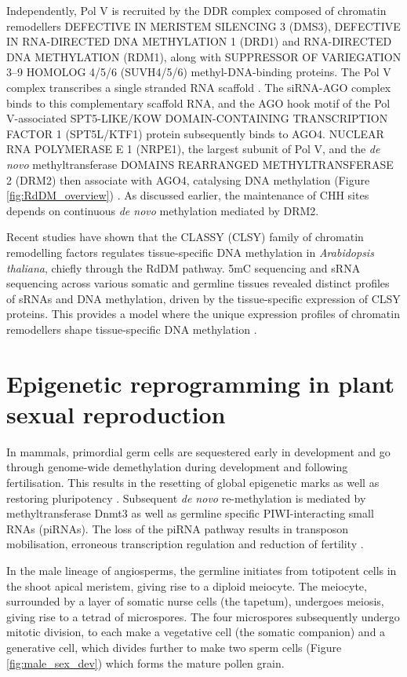 Independently, Pol V is recruited by the DDR complex composed of chromatin remodellers DEFECTIVE IN MERISTEM SILENCING 3 (DMS3), DEFECTIVE IN RNA-DIRECTED DNA METHYLATION 1 (DRD1) and RNA-DIRECTED DNA METHYLATION (RDM1), along with SUPPRESSOR OF VARIEGATION 3–9 HOMOLOG 4/5/6 (SUVH4/5/6) methyl-DNA-binding proteins. The Pol V complex transcribes a single stranded RNA scaffold \cite{RN33}. The siRNA-AGO complex binds to this complementary scaffold RNA, and the AGO hook motif of the Pol V-associated SPT5-LIKE/KOW DOMAIN-CONTAINING TRANSCRIPTION FACTOR 1 (SPT5L/KTF1) protein subsequently binds to AGO4. NUCLEAR RNA POLYMERASE E 1 (NRPE1), the largest subunit of Pol V, and the \textit{de novo} methyltransferase DOMAINS REARRANGED METHYLTRANSFERASE 2 (DRM2) then associate with AGO4, catalysing DNA methylation (Figure \ref{fig:RdDM_overview})  \cite{RN228,RN121,RN122}. As discussed earlier, the maintenance of CHH sites depends on continuous \textit{de novo} methylation mediated by DRM2.

Recent studies have shown that the CLASSY (CLSY) family of chromatin remodelling factors regulates tissue-specific DNA methylation in \textit{Arabidopsis thaliana}, chiefly through the RdDM pathway. 5mC sequencing and sRNA sequencing across various somatic and germline tissues revealed distinct profiles of sRNAs and DNA methylation, driven by the tissue-specific expression of CLSY proteins. This provides a model where the unique expression profiles of chromatin remodellers shape tissue-specific DNA methylation \cite{RN162}.  

\section{Epigenetic reprogramming in plant sexual reproduction}

In mammals, primordial germ cells are sequestered early in development and go through genome-wide demethylation during development and following fertilisation. This results in the resetting of global epigenetic marks as well as restoring pluripotency \cite{RN210}. Subsequent \textit{de novo} re-methylation is mediated by methyltransferase Dnmt3 as well as germline specific PIWI-interacting small RNAs (piRNAs). The loss of the piRNA pathway results in transposon mobilisation, erroneous transcription regulation and reduction of fertility \cite{RN124,RN125,RN126}.

In the male lineage of angiosperms, the germline initiates from totipotent cells in the shoot apical meristem, giving rise to a diploid meiocyte. The meiocyte, surrounded by a layer of somatic nurse cells (the tapetum), undergoes meiosis, giving rise to a tetrad of microspores. The four microspores subsequently undergo mitotic division, to each make a vegetative cell (the somatic companion) and a generative cell, which divides further to make two sperm cells (Figure \ref{fig:male_sex_dev}) \cite{RN14,RN199} which forms the mature pollen grain. 

